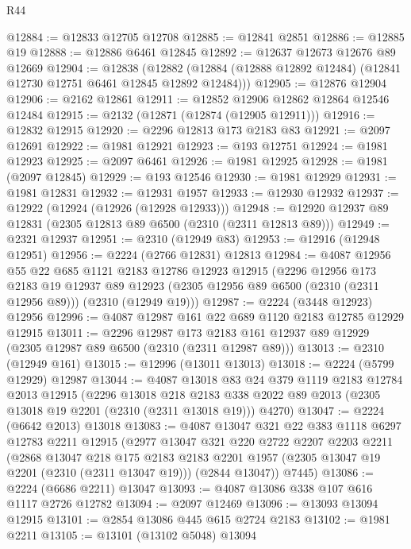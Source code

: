 \begin{lexlean}{R44}
\begin{coremodule}
@12884 := @12833 @12705 @12708
@12885 := @12841 @2851
@12886 := @12885 @19
@12888 := @12886 @6461 @12845
@12892 := @12637 @12673 @12676 @89 @12669
@12904 := @12838
    (@12882 (@12884 (@12888 @12892 @12484) (@12841 @12730 @12751 @6461 @12845 @12892 @12484)))
@12905 := @12876 @12904
@12906 := @2162 @12861
@12911 := @12852 @12906 @12862 @12864 @12546 @12484
@12915 := @2132 (@12871 (@12874 (@12905 @12911)))
@12916 := @12832 @12915
@12920 := @2296 @12813 @173 @2183 @83
@12921 := @2097 @12691
@12922 := @1981 @12921
@12923 := @193 @12751
@12924 := @1981 @12923
@12925 := @2097 @6461
@12926 := @1981 @12925
@12928 := @1981 (@2097 @12845)
@12929 := @193 @12546
@12930 := @1981 @12929
@12931 := @1981 @12831
@12932 := @12931 @1957
@12933 := @12930 @12932
@12937 := @12922 (@12924 (@12926 (@12928 @12933)))
@12948 := @12920 @12937 @89 @12831 (@2305 @12813 @89 @6500 (@2310 (@2311 @12813 @89)))
@12949 := @2321 @12937
@12951 := @2310 (@12949 @83)
@12953 := @12916 (@12948 @12951)
@12956 := @2224 (@2766 @12831) @12813
@12984 := @4087
    @12956
    @55
    @22
    @685
    @1121
    @2183
    @12786
    @12923
    @12915
    (@2296
      @12956
      @173
      @2183
      @19
      @12937
      @89
      @12923
      (@2305 @12956 @89 @6500 (@2310 (@2311 @12956 @89)))
      (@2310 (@12949 @19)))
@12987 := @2224 (@3448 @12923) @12956
@12996 := @4087 @12987 @161 @22 @689 @1120 @2183 @12785 @12929 @12915
@13011 := @2296
    @12987
    @173
    @2183
    @161
    @12937
    @89
    @12929
    (@2305 @12987 @89 @6500 (@2310 (@2311 @12987 @89)))
@13013 := @2310 (@12949 @161)
@13015 := @12996 (@13011 @13013)
@13018 := @2224 (@5799 @12929) @12987
@13044 := @4087
    @13018
    @83
    @24
    @379
    @1119
    @2183
    @12784
    @2013
    @12915
    (@2296
      @13018
      @218
      @2183
      @338
      @2022
      @89
      @2013
      (@2305 @13018 @19 @2201 (@2310 (@2311 @13018 @19)))
      @4270)
@13047 := @2224 (@6642 @2013) @13018
@13083 := @4087
    @13047
    @321
    @22
    @383
    @1118
    @6297
    @12783
    @2211
    @12915
    (@2977
      @13047
      @321
      @220
      @2722
      @2207
      @2203
      @2211
      (@2868
        @13047
        @218
        @175
        @2183
        @2183
        @2201
        @1957
        (@2305 @13047 @19 @2201 (@2310 (@2311 @13047 @19)))
        (@2844 @13047))
      @7445)
@13086 := @2224 (@6686 @2211) @13047
@13093 := @4087 @13086 @338 @107 @616 @1117 @2726 @12782
@13094 := @2097 @12469
@13096 := @13093 @13094 @12915
@13101 := @2854 @13086 @445 @615 @2724 @2183
@13102 := @1981 @2211
@13105 := @13101 (@13102 @5048) @13094

\end{coremodule}
\end{lexlean}
